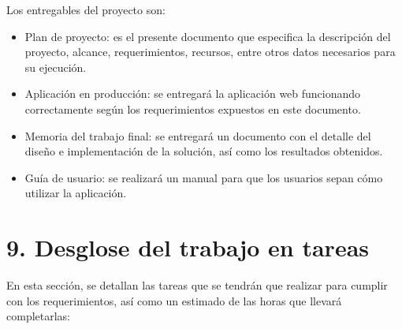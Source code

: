\documentclass[
11pt, %
codirector, %
]{charter}
\begin{document}
Los entregables del proyecto son:

\begin{itemize}
	\item Plan de proyecto: es el presente documento que especifica la descripción del proyecto, alcance, requerimientos, recursos, entre otros datos necesarios para su ejecución.
	\item Aplicación en producción: se entregará la aplicación web funcionando correctamente según los requerimientos expuestos en este documento.
	\item Memoria del trabajo final: se entregará un documento con el detalle del diseño e implementación de la solución, así como los resultados obtenidos.
	\item Guía de usuario: se realizará un manual para que los usuarios sepan cómo utilizar la aplicación.
\end{itemize}

\section{9. Desglose del trabajo en tareas}
\label{sec:wbs}

En esta sección, se detallan las tareas que se tendrán que realizar para cumplir con los requerimientos, así como un estimado de las horas que llevará completarlas:
\end{document}
